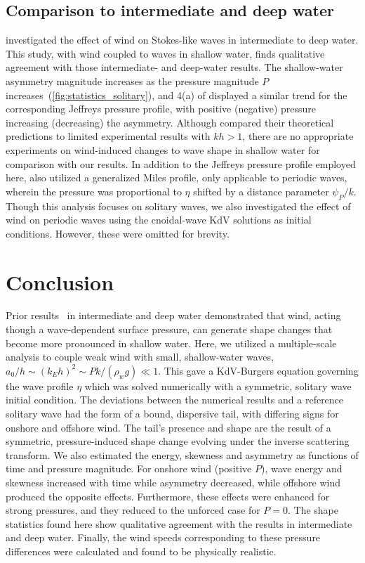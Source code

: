 \documentclass{jfm}
\begin{document}
\subsection{Comparison to intermediate and deep water}
 investigated the effect of
wind on Stokes-like waves in intermediate to deep water.
This study, with wind coupled to waves in shallow water, finds
qualitative agreement with those intermediate- and deep-water results.
The shallow-water asymmetry magnitude increases as the pressure
magnitude $P$ increases~(\cref{fig:statistics_solitary}), and \figname{}
4(a) of \citet{zdyrski2020wind} displayed a similar trend for the
corresponding Jeffreys pressure profile, with positive (negative)
pressure increasing (decreasing) the asymmetry.
Although \citet{zdyrski2020wind} compared their theoretical
predictions to limited experimental results with $kh > 1$, there are no
appropriate experiments on wind-induced changes to wave shape in shallow
water for comparison with our results.
In addition to the Jeffreys pressure profile employed here,
\citet{zdyrski2020wind} also utilized a generalized Miles profile,
only applicable to periodic waves, wherein the pressure was proportional
to $\eta$ shifted by a distance parameter $\psi_P/k$.
Though this analysis focuses on solitary waves, we also investigated the
effect of wind on periodic waves using the cnoidal-wave KdV solutions as
initial conditions.
However, these were omitted for brevity.

\vspace{-0.25cm}
\section{Conclusion}
Prior results~\citep{zdyrski2020wind} in intermediate and deep water
demonstrated that wind, acting though a wave-dependent surface
pressure, can generate shape changes that become more pronounced in
shallow water.
Here, we utilized a multiple-scale analysis to couple weak wind with
small, shallow-water waves, \ie{} $a_0/h \sim (k_E h)^2 \sim P k/(\rho_w
g) \ll 1$.
This gave a KdV-Burgers equation governing the wave profile $\eta$
which was solved numerically with a symmetric, solitary wave initial
condition.
The deviations between the numerical results and a reference solitary
wave had the form of a bound, dispersive tail, with differing signs for
onshore and offshore wind.
The tail's presence and shape are the result of a symmetric,
pressure-induced shape change evolving under the inverse scattering
transform.
We also estimated the energy, skewness and
asymmetry as functions of time and pressure magnitude.
For onshore wind (positive $P$), wave energy and skewness increased with
time while asymmetry decreased, while offshore wind produced the
opposite effects.
Furthermore, these effects were enhanced for strong pressures, and they
reduced to the unforced case for $P=0$.
The shape statistics found here show qualitative agreement with the
results in intermediate and deep water.
Finally, the wind speeds corresponding to these pressure differences
were calculated and found to be physically realistic.
\end{document}
